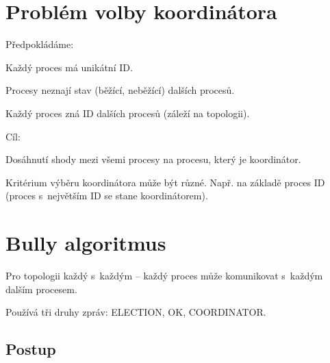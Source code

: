 
\section{Problém volby koordinátora}

\begin{compactitem}
    \item Předpokládáme:
    \begin{compactitem}
        \item Každý proces má unikátní ID.
        \item Procesy neznají stav (běžící, neběžící) dalších procesů.
        \item Každý proces zná ID dalších procesů (záleží na topologii).
    \end{compactitem}
    \item Cíl:
    \begin{compactitem}
        \item Dosáhnutí shody mezi všemi procesy na procesu, který je koordinátor.
        \item Kritérium výběru koordinátora může být různé. Např. na základě proces ID (proces s~největším ID se stane koordinátorem).
    \end{compactitem}
\end{compactitem}


\section{Bully algoritmus}

\begin{compactitem}
    \item Pro topologii každý s~každým -- každý proces může komunikovat s~každým dalším procesem.

    \item Používá tři druhy zpráv: ELECTION, OK, COORDINATOR.
\end{compactitem}

\subsection{Postup}


